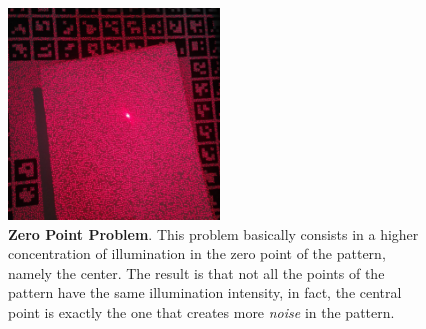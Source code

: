 \begin{figure}
    \centering
    \includegraphics[width=0.5\textwidth]{figures/4_experiments/laser_pattern_problem}
    \caption{\textbf{Zero Point Problem}. This problem basically consists in a higher concentration of illumination in the zero point of the pattern, namely the center. The result is that not all the points of the pattern have the same illumination intensity, in fact, the central point is exactly the one that creates more \emph{noise} in the pattern.}
    \label{fig:laser_pattern_problem}
\end{figure}

